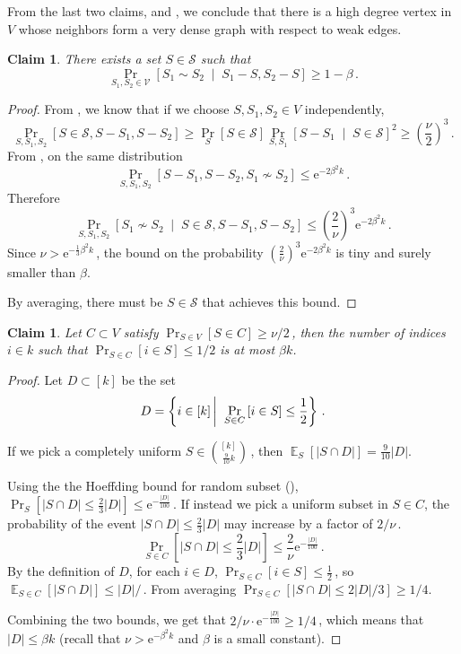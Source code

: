 \documentclass[11pt]{article}
\numberwithin{equation}{section}
\newtheorem{claim}[theorem]{Claim}
\theoremstyle{definition}
\theoremstyle{plain}
\newcommand{\eee}{\mathrm e}
\newcommand{\Prob}[2][]{\Pr_{{#1}}\left[#2\right]} %
\DeclareMathOperator*{\E}{\mathbb{E}} %
\newcommand{\Ex}[2][]{\E_{{#1}}\Brac{#2}} %
\newcommand{\Paren}[1]{\left(#1\right)} %
\newcommand{\Brac}[1]{\left[#1\right]} %
\newcommand{\abs}[1]{\lvert#1\rvert} %
\newcommand{\given}{\;\middle\vert\;} %
\newcommand\sett[2]{\left\{ #1 \left| \; \vphantom{#1 #2} \right. #2  \right\}} %
\newcommand\wconn{\sim} %
\newcommand\sconn{-} %
\begin{document}
From the last two claims,  and , we conclude that there is a high degree vertex in $V$ whose neighbors form a very dense graph with respect to weak edges.
\begin{claim} \label{claim:almost clique}
	There exists a set $S\in\mathcal{S}$ such that
	\[\Prob[S_1,S_2\in\mathcal{V}]{S_1\wconn S_2 \given S_1\sconn S,S_2\sconn S} \geq 1-\beta\,.\]%
\end{claim}
\begin{proof}
	From , we know that if we choose $S,S_1,S_2\in V$ independently,
	\[\Prob[S,S_1,S_2]{S\in\mathcal{S},S\sconn S_1,S\sconn S_2} \geq \Prob[S]{S\in\mathcal{S}}\Prob[S,S_1]{S\sconn S_1\given S\in \mathcal{S}}^2\geq \Paren{\frac{\nu}{2}}^3 \,.\]%
	From , on the same distribution
	\[\Prob[S,S_1,S_2]{S\sconn S_1,S\sconn S_2,S_1\not\wconn S_2} \leq \eee^{-2\beta^2 k}\,.\]%
	Therefore
	\[\Prob[S,S_1,S_2]{S_1\not\wconn S_2\given S\in\mathcal{S}, S\sconn S_1,S\sconn S_2} \leq \Paren{\frac{2}{\nu}}^3 \eee^{-2\beta^2 k}\,. \]%
	Since $\nu > \eee^{-\frac{1}{3}\beta^2 k}$\,, the bound on the probability $\Paren{\frac{2}{\nu}}^3 \eee^{-2\beta^2 k}$ is tiny and surely smaller than $\beta$.
	
%
By  %
averaging, there must be ${S}\in\mathcal{S}$ that achieves this bound.
\end{proof}

\begin{claim}\label{claim:half index}
	Let $C\subset V$ satisfy $\Pr_{S\in V}[S\in C]\geq 
 \nu/2$\,, %
 then the number of indices $i\in k$ such that $\Prob[S\in C]{i\in S}\leq 
	1/2$ %
	 is at most $\beta k$.
\end{claim}
\begin{proof}
	Let $D\subset[k]$ be the set
	\[ D = \sett{i\in [k]}{\Prob[S\in C]{i\in S}\leq \frac{1}{2}}\,.\]%
	
	If we pick a completely uniform $S\in\binom{[k]}{\frac{9}{10}k}$\,, then $\Ex[S]{\abs{S\cap D}} = \frac{9}{10}\abs{D}.$

Using
the  %
%
%
the Hoeffding bound for random subset (), %
%
$\Prob[S]{\abs{S\cap D} \leq \frac{2}{3}\abs{D}} \leq 
	\eee^{-\frac{\abs{D}}{100}}\,.$
	If instead we pick a uniform subset in $S\in C$, the probability of the event $\abs{S\cap D} \leq \frac{2}{3}\abs{D}$ may increase by a factor of 
	$2/\nu$\,. %
	\[ \Prob[S\in C]{\abs{S\cap D} \leq \frac{2}{3}\abs{D}} \leq \frac{2}{\nu}\eee^{-\frac{\abs{D}}{100}}\,.\]%
	By the definition of $D$, for each $i\in D$, $\Prob[S\in C]{i\in S} \leq \frac{1}{2}$\,, so $\Ex[S\in C]{\abs{S\cap D}} \leq 
	\abs{D}/$\,.
	From averaging $\Prob[S\in C]{\abs{S\cap D} \leq 
%
	2\abs{D}/3%
	} \geq 
	1/4.$ %
	
	Combining the two bounds, we get that 
       $2/\nu\cdot\eee^{-\frac{\abs{D}}{100}} \geq 1/4 $\,,  %
%
	 which means that $\abs{D}\leq \beta k$ (recall that $\nu > \eee^{-\beta^2 k}$ and $\beta$ is a small constant).
\end{proof}
\end{document}
